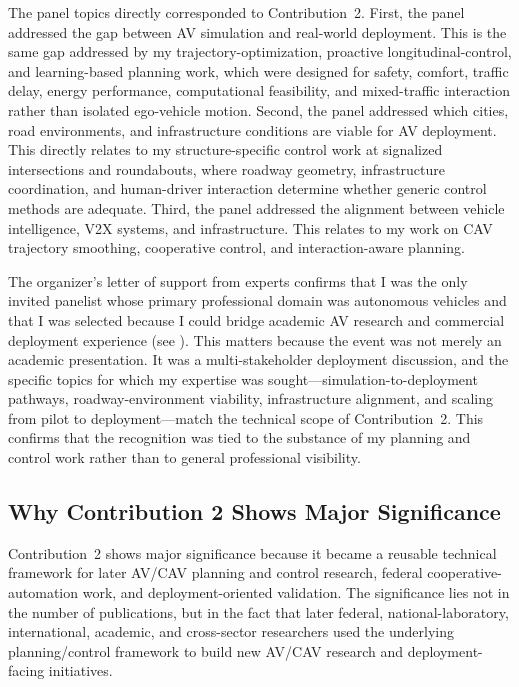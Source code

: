 \documentclass[11pt,letterpaper]{article}
\begin{document}
The panel topics directly corresponded to Contribution~2. First, the panel addressed the gap between AV simulation and real-world deployment. This is the same gap addressed by my trajectory-optimization, proactive longitudinal-control, and learning-based planning work, which were designed for safety, comfort, traffic delay, energy performance, computational feasibility, and mixed-traffic interaction rather than isolated ego-vehicle motion. Second, the panel addressed which cities, road environments, and infrastructure conditions are viable for AV deployment. This directly relates to my structure-specific control work at signalized intersections and roundabouts, where roadway geometry, infrastructure coordination, and human-driver interaction determine whether generic control methods are adequate. Third, the panel addressed the alignment between vehicle intelligence, V2X systems, and infrastructure. This relates to my work on CAV trajectory smoothing, cooperative control, and interaction-aware planning.

The organizer's letter of support from experts confirms that I was the only invited panelist whose primary professional domain was autonomous vehicles and that I was selected because I could bridge academic AV research and commercial deployment experience (see ). This matters because the event was not merely an academic presentation. It was a multi-stakeholder deployment discussion, and the specific topics for which my expertise was sought---simulation-to-deployment pathways, roadway-environment viability, infrastructure alignment, and scaling from pilot to deployment---match the technical scope of Contribution~2. This confirms that the recognition was tied to the substance of my planning and control work rather than to general professional visibility.

\subsection{Why Contribution 2 Shows Major Significance}

Contribution~2 shows major significance because it became a reusable technical framework for later AV/CAV planning and control research, federal cooperative-automation work, and deployment-oriented validation. The significance lies not in the number of publications, but in the fact that later federal, national-laboratory, international, academic, and cross-sector researchers used the underlying planning/control framework to build new AV/CAV research and deployment-facing initiatives.
\end{document}
